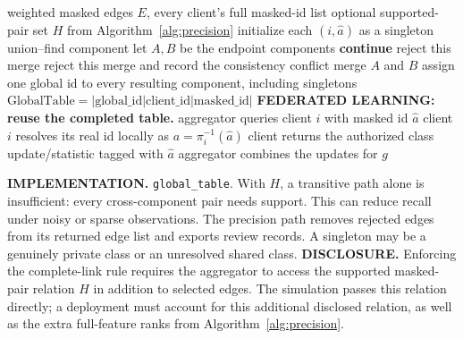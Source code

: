 \documentclass[11pt]{article}
\begin{document}
\begin{algorithm}[p]
\caption{Global relation table with optional complete-link verification; subsequent FL queries}
\label{alg:gid}
\small\begin{algorithmic}[1]
\Require weighted masked edges $E$, every client's full masked-id list
\Require optional supported-pair set $H$ from Algorithm~\ref{alg:precision}
\State initialize each $(i,\hat a)$ as a singleton union--find component
 \State let $A,B$ be the endpoint components
  \State \textbf{continue}
 \EndIf
  \State reject this merge
  \State reject this merge and record the consistency conflict
 \Else
  \State merge $A$ and $B$
 \EndIf
\EndFor
\State assign one global id to every resulting component, including singletons
\State \Return $\mathrm{GlobalTable}=|\mathrm{global\_id}|\mathrm{client\_id}|\mathrm{masked\_id}|$
\Statex \hrulefill
\Statex \textbf{FEDERATED LEARNING: reuse the completed table.}
  \State aggregator queries client $i$ with masked id $\hat a$
  \State client $i$ resolves its real id locally as $a=\pi_i^{-1}(\hat a)$
  \State client returns the authorized class update/statistic tagged with $\hat a$
 \EndFor
 \State aggregator combines the updates for $g$
\EndFor
\Statex \hrulefill
\Statex \raggedright\textbf{IMPLEMENTATION.} \texttt{global\_table}. With $H$, a transitive
path alone is insufficient: every cross-component pair needs support. This
can reduce recall under noisy or sparse observations. The precision path
removes rejected edges from its returned edge list and exports review records.
A singleton may be a genuinely private class or an unresolved shared class.
\Statex
\Statex \textbf{DISCLOSURE.} Enforcing the complete-link rule requires the
aggregator to access the supported masked-pair relation $H$ in addition to
selected edges. The simulation passes this relation directly; a deployment
must account for this additional disclosed relation, as well as the extra
full-feature ranks from Algorithm~\ref{alg:precision}.
\end{algorithmic}\end{algorithm}
\end{document}

